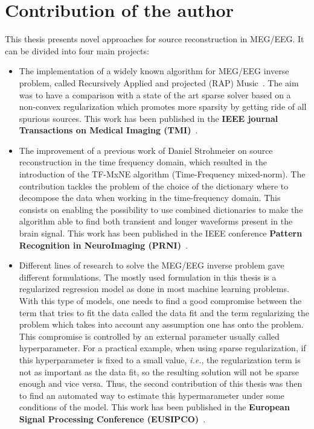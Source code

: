 \section*{Contribution of the author}
This thesis presents novel approaches for source reconstruction in MEG/EEG. It can be divided into four main projects:
\begin{itemize}
\item The implementation of a widely known algorithm for MEG/EEG inverse problem, called Recursively Applied and projected (RAP) Music~\cite{mosher-leahy:1999}. The aim was to have a comparison with a state of the art sparse solver based on a non-convex regularization which promotes more sparsity by getting ride of all spurious sources. This work has been published in the \textbf{IEEE journal Transactions on Medical Imaging (TMI)}~\cite{strohmeier-etal:16}.

\item The improvement of a previous work of Daniel Strohmeier on source reconstruction in the time frequency domain, which resulted in the introduction of the TF-MxNE algorithm (Time-Frequency mixed-norm). The contribution tackles the problem of the choice of the dictionary where to decompose the data when working in the time-frequency domain. This consists on enabling the possibility to use combined dictionaries to make the algorithm able to find both transient and longer waveforms present in the brain signal. This work has been published in the IEEE conference \textbf{Pattern Recognition in NeuroImaging (PRNI)}~\cite{bekhti2016m}.

\item Different lines of research to solve the MEG/EEG inverse problem gave different formulations. The mostly used formulation in this thesis is a regularized regression model as done in most machine learning problems. With this type of models, one needs to find a good compromise between the term that tries to fit the data called the data fit and the term regularizing the problem which takes into account any assumption one has onto the problem. This compromise is controlled by an external parameter usually called hyperparameter. For a practical example, when using sparse regularization, if this hyperparameter is fixed to a small value, \textit{i.e.}, the regularization term is not as important as the data fit, so the resulting solution will not be sparse enough and vice versa. Thus, the second contribution of this thesis was then to find an automated way to estimate this hypermarameter under some conditions of the model. This work has been published in the \textbf{European Signal Processing Conference (EUSIPCO)}~\cite{bekhti_eusipco}.


\end{itemize}
